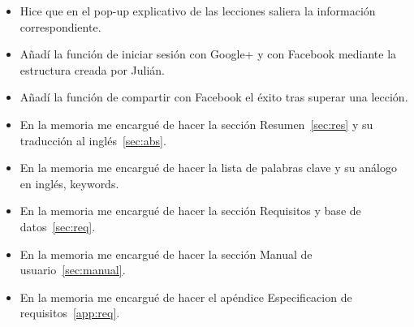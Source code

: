 \begin{itemize}
\item
Hice que en el pop-up explicativo de las lecciones saliera la información correspondiente.

\item
Añadí la función de iniciar sesión con Google+ y con Facebook mediante la estructura creada por Julián.

\item
Añadí la función de compartir con Facebook el éxito tras superar una lección.

\item
En la memoria me encargué de hacer la sección Resumen~\ref{sec:res} y su traducción al inglés~\ref{sec:abs}.

\item
En la memoria me encargué de hacer la lista de palabras clave y su análogo en inglés, keywords.

\item
En la memoria me encargué de hacer la sección Requisitos y base de datos~\ref{sec:req}.

\item
En la memoria me encargué de hacer la sección Manual de usuario~\ref{sec:manual}.

\item
En la memoria me encargué de hacer el apéndice Especificacion de requisitos~\ref{app:req}.

\end{itemize}